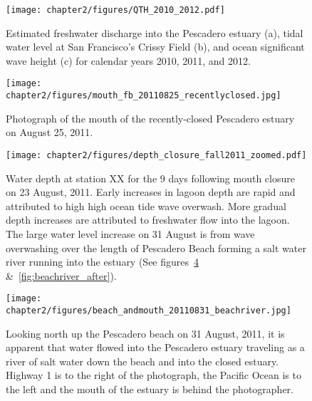 \begin{figure}
	\begin{center}
		\texttt{[image: chapter2/figures/QTH\_2010\_2012.pdf]} \caption{Estimated freshwater discharge into the Pescadero estuary (a), tidal water level at San Francisco's Crissy Field (b), and ocean significant wave height (c) for calendar years 2010, 2011, and 2012.}\label{fig:QTH_2010_2012}  
	\end{center}
\end{figure}

\begin{figure}
	\begin{center}
		\texttt{[image: chapter2/figures/mouth\_fb\_20110825\_recentlyclosed.jpg]} \caption{Photograph of the mouth of the recently-closed Pescadero estuary on August 25, 2011.}
	\end{center}
\label{fig:mouth_fb_20110825} \end{figure}


\begin{figure}
	\begin{center}
		\texttt{[image: chapter2/figures/depth\_closure\_fall2011\_zoomed.pdf]} \caption{Water depth at station XX for the 9 days following mouth closure on 23 August, 2011. Early increases in lagoon depth are rapid and attributed to high high ocean tide wave overwash. More gradual depth increases are attributed to freshwater flow into the lagoon. The large water level increase on 31 August is from wave overwashing over the length of Pescadero Beach forming a salt water river running into the estuary (See figures~\ref{fig:beachriver} \&~\ref{fig:beachriver_after}).}
	\end{center}
\label{fig:depthclosuref11} \end{figure}


\begin{figure}
	\begin{center}
		\texttt{[image: chapter2/figures/beach\_andmouth\_20110831\_beachriver.jpg]} \caption{Looking north up the Pescadero beach on 31 August, 2011, it is apparent that water flowed into the Pescadero estuary traveling as a river of salt water down the beach and into the closed estuary. Highway 1 is to the right of the photograph, the Pacific Ocean is to the left and the mouth of the estuary is behind the photographer.}
	\end{center} \label{fig:beachriver} 
\end{figure}

